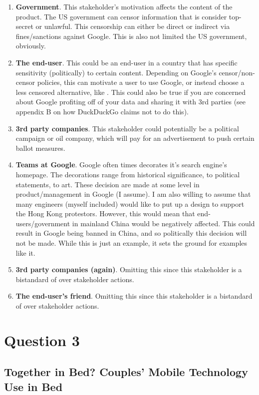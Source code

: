 \begin{enumerate}
\item
  \textbf{Government}. This stakeholder's motivation affects the content of the product. The US government can censor information that is consider top-secret or unlawful. This censorship can either be direct or indirect via fines/sanctions against Google. This is also not limited the US government, obviously.
\item
  \textbf{The end-user}. This could be an end-user in a country that has specific sensitivity (politically) to certain content. Depending on Google's censor/non-censor policies, this can motivate a user to use Google, or instead choose a less censored alternative, like . This could also be true if you are concerned about Google profiting off of your data and sharing it with 3rd parties (see appendix B on how DuckDuckGo claims not to do this).
\item
  \textbf{3rd party companies}. This stakeholder could potentially be a political campaign or oil company, which will pay for an advertisement to push certain ballot measures.
\item
  \textbf{Teams at Google}. Google often times decorates it's search engine's homepage. The decorations range from historical significance, to political statements, to art. These decision are made at some level in product/management in Google (I assume). I am also willing to assume that many engineers (myself included) would like to put up a design to support the Hong Kong protestors. However, this would mean that end-users/government in mainland China would be negatively affected. This could result in Google being banned in China, and so politically this decision will not be made. While this is just an example, it sets the ground for examples like it.
\item
  \textbf{3rd party companies (again)}. Omitting this since this stakeholder is a bistandard of over stakeholder actions.
\item
  \textbf{The end-user's friend}. Omitting this since this stakeholder is a bistandard of over stakeholder actions.
\end{enumerate}

\section{Question 3}

\subsection{Together in Bed? Couples’ Mobile Technology Use in Bed}

